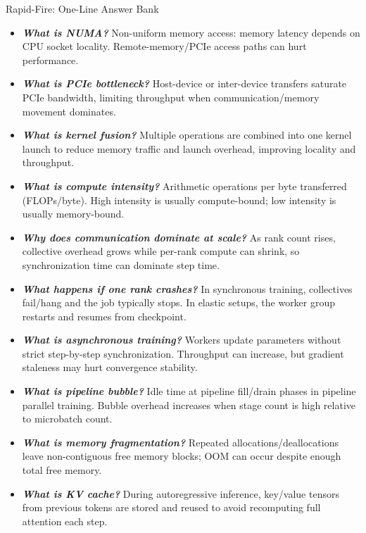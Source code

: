 \documentclass[12pt]{article}
\let\origtextbf\textbf
\renewcommand{\textbf}[1]{\origtextbf{\textit{#1}}}
\begin{document}
\begin{bluebox}{Rapid-Fire: One-Line Answer Bank}
\begin{itemize}
\item \textbf{What is NUMA?} Non-uniform memory access: memory latency depends on CPU socket locality. Remote-memory/PCIe access paths can hurt performance.

\item \textbf{What is PCIe bottleneck?} Host-device or inter-device transfers saturate PCIe bandwidth, limiting throughput when communication/memory movement dominates.

\item \textbf{What is kernel fusion?} Multiple operations are combined into one kernel launch to reduce memory traffic and launch overhead, improving locality and throughput.

\item \textbf{What is compute intensity?} Arithmetic operations per byte transferred (FLOPs/byte). High intensity is usually compute-bound; low intensity is usually memory-bound.

\item \textbf{Why does communication dominate at scale?} As rank count rises, collective overhead grows while per-rank compute can shrink, so synchronization time can dominate step time.

\item \textbf{What happens if one rank crashes?} In synchronous training, collectives fail/hang and the job typically stops. In elastic setups, the worker group restarts and resumes from checkpoint.

\item \textbf{What is asynchronous training?} Workers update parameters without strict step-by-step synchronization. Throughput can increase, but gradient staleness may hurt convergence stability.

\item \textbf{What is pipeline bubble?} Idle time at pipeline fill/drain phases in pipeline parallel training. Bubble overhead increases when stage count is high relative to microbatch count.

\item \textbf{What is memory fragmentation?} Repeated allocations/deallocations leave non-contiguous free memory blocks; OOM can occur despite enough total free memory.

\item \textbf{What is KV cache?} During autoregressive inference, key/value tensors from previous tokens are stored and reused to avoid recomputing full attention each step.


\end{itemize}
\end{bluebox}
\end{document}
